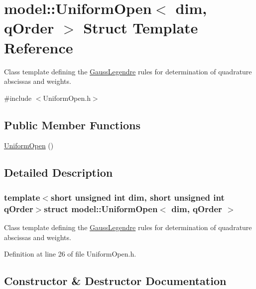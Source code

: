 \hypertarget{structmodel_1_1_uniform_open}{}\section{model\+:\+:Uniform\+Open$<$ dim, q\+Order $>$ Struct Template Reference}
\label{structmodel_1_1_uniform_open}


Class template defining the \hyperlink{structmodel_1_1_gauss_legendre}{Gauss\+Legendre} rules for determination of quadrature abscissas and weights.  




{\ttfamily \#include $<$Uniform\+Open.\+h$>$}

\subsection*{Public Member Functions}
\begin{DoxyCompactItemize}
\item 
\hyperlink{structmodel_1_1_uniform_open_a67944163277112a07437bcd213ca9a40}{Uniform\+Open} ()
\end{DoxyCompactItemize}


\subsection{Detailed Description}
\subsubsection*{template$<$short unsigned int dim, short unsigned int q\+Order$>$struct model\+::\+Uniform\+Open$<$ dim, q\+Order $>$}

Class template defining the \hyperlink{structmodel_1_1_gauss_legendre}{Gauss\+Legendre} rules for determination of quadrature abscissas and weights. 

Definition at line 26 of file Uniform\+Open.\+h.



\subsection{Constructor \& Destructor Documentation}
\hypertarget{structmodel_1_1_uniform_open_a67944163277112a07437bcd213ca9a40}{}
